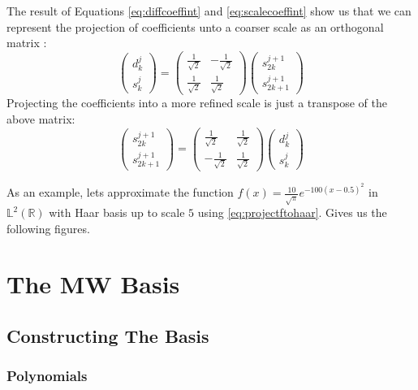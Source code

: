 \documentclass[../master_thesis.tex]{subfiles}
\begin{document}
The result of Equations \ref{eq:diffcoeffint} and \ref{eq:scalecoeffint} show us
that we can represent the projection of coefficients unto a coarser scale as an
orthogonal matrix \cite{Sorland, Beylkin:MRA}:
\begin{equation}
  \begin{pmatrix}
    d^{j}_k \\
    s^{j}_k
  \end{pmatrix} =
  \begin{pmatrix}
    \frac{1}{\sqrt{2}} & -\frac{1}{\sqrt{2}} \\
    \frac{1}{\sqrt{2}} & \frac{1}{\sqrt{2}}
  \end{pmatrix}
  \begin{pmatrix}
    s^{j+1}_{2k} \\
    s^{j+1}_{2k+1}
  \end{pmatrix}
\end{equation}
Projecting the coefficients into a more refined scale is just a transpose of the
above matrix:
\begin{equation}
  \begin{pmatrix}
    s^{j+1}_{2k} \\
    s^{j+1}_{2k+1}
  \end{pmatrix} =
  \begin{pmatrix}
    \frac{1}{\sqrt{2}} & \frac{1}{\sqrt{2}} \\
    -\frac{1}{\sqrt{2}} & \frac{1}{\sqrt{2}}
  \end{pmatrix}
  \begin{pmatrix}
    d^{j}_k \\
    s^{j}_k
  \end{pmatrix}
\end{equation}

As an example, lets approximate the function
$f(x) = \frac{10}{\sqrt{\pi}}e^{-100(x - 0.5)^2}$ in $\mathbb{L}^2(\mathbb{R})$
with Haar basis up to scale $5$ using \ref{eq:projectftohaar}. Gives us the
following figures.

\section{The \ac{MW} Basis}

\subsection{Constructing The Basis}
\subsubsection{Polynomials}
\end{document}
